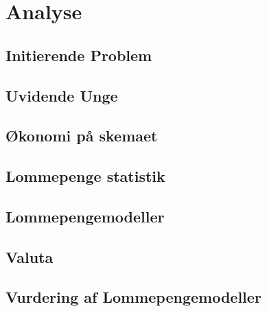 





\chapter{Analyse}

\section{Initierende Problem}


\section{Uvidende Unge}
\label{UvidendeUnge}


\section{Økonomi på skemaet}
\label{ØkonomiSke}


\section{Lommepenge statistik}
\label{LommeStat}


\section{Lommepengemodeller}
\label{LommeModeller}


\section{Valuta}
\label{Valuta}


\section{Vurdering af Lommepengemodeller}
\label{ModelVurdering}



%





